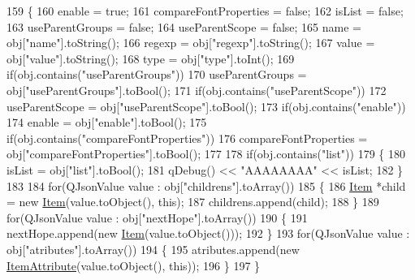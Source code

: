 \begin{DoxyCode}
159 \{
160     enable = \textcolor{keyword}{true};
161     compareFontProperties = \textcolor{keyword}{false};
162     isList = \textcolor{keyword}{false};
163     useParentGroups = \textcolor{keyword}{false};
164     useParentScope = \textcolor{keyword}{false};
165     name = obj[\textcolor{stringliteral}{"name"}].toString();
166     regexp = obj[\textcolor{stringliteral}{"regexp"}].toString();
167     value = obj[\textcolor{stringliteral}{"value"}].toString();
168     type = obj[\textcolor{stringliteral}{"type"}].toInt();
169     \textcolor{keywordflow}{if}(obj.contains(\textcolor{stringliteral}{"useParentGroups"}))
170         useParentGroups = obj[\textcolor{stringliteral}{"useParentGroups"}].toBool();
171     \textcolor{keywordflow}{if}(obj.contains(\textcolor{stringliteral}{"useParentScope"}))
172         useParentScope = obj[\textcolor{stringliteral}{"useParentScope"}].toBool();
173     \textcolor{keywordflow}{if}(obj.contains(\textcolor{stringliteral}{"enable"}))
174         enable = obj[\textcolor{stringliteral}{"enable"}].toBool();
175     \textcolor{keywordflow}{if}(obj.contains(\textcolor{stringliteral}{"compareFontProperties"}))
176         compareFontProperties = obj[\textcolor{stringliteral}{"compareFontProperties"}].toBool();
177 
178     \textcolor{keywordflow}{if}(obj.contains(\textcolor{stringliteral}{"list"}))
179     \{
180         isList = obj[\textcolor{stringliteral}{"list"}].toBool();
181         qDebug() << \textcolor{stringliteral}{"AAAAAAAA"} << isList;
182     \}
183 
184     \textcolor{keywordflow}{for}(QJsonValue value : obj[\textcolor{stringliteral}{"childrens"}].toArray())
185     \{
186         \hyperlink{class_item}{Item} *child = \textcolor{keyword}{new} \hyperlink{class_item_aabd972d6d2b789c2ea8d83c127b9bfa6}{Item}(value.toObject(), \textcolor{keyword}{this});
187         childrens.append(child);
188     \}
189     \textcolor{keywordflow}{for}(QJsonValue value : obj[\textcolor{stringliteral}{"nextHope"}].toArray())
190     \{
191         nextHope.append(\textcolor{keyword}{new} \hyperlink{class_item_aabd972d6d2b789c2ea8d83c127b9bfa6}{Item}(value.toObject()));
192     \}
193     \textcolor{keywordflow}{for}(QJsonValue value : obj[\textcolor{stringliteral}{"atributes"}].toArray())
194     \{
195         atributes.append(\textcolor{keyword}{new} \hyperlink{class_item_attribute}{ItemAttribute}(value.toObject(), \textcolor{keyword}{this}));
196     \}
197 \}
\end{DoxyCode}
\mbox{\label{class_item_a0922eea7bc56f3f87a134210b56dde2c}} 
